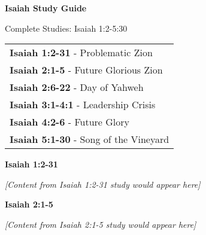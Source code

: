 \documentclass[11pt]{article}
\begin{document}
\begin{center}
{\Huge\bfseries Isaiah Study Guide}
\end{center}
\vspace{20pt}

\begin{center}
{\Large Complete Studies: Isaiah 1:2-5:30}
\end{center}
\vspace{15pt}

\begin{center}
\begin{tabular}{l}
\textbf{Isaiah 1:2-31} - Problematic Zion \\
\textbf{Isaiah 2:1-5} - Future Glorious Zion \\
\textbf{Isaiah 2:6-22} - Day of Yahweh \\
\textbf{Isaiah 3:1-4:1} - Leadership Crisis \\
\textbf{Isaiah 4:2-6} - Future Glory \\
\textbf{Isaiah 5:1-30} - Song of the Vineyard \\
\end{tabular}
\end{center}

\vspace{30pt}


\newpage

\begin{center}
{\Huge\bfseries Isaiah 1:2-31}
\end{center}
\vspace{10pt}


\vspace{2em}
\textit{[Content from Isaiah 1:2-31 study would appear here]}

\newpage

\begin{center}
{\Huge\bfseries Isaiah 2:1-5}
\end{center}
\vspace{10pt}


\vspace{2em}
\textit{[Content from Isaiah 2:1-5 study would appear here]}
\end{document}
